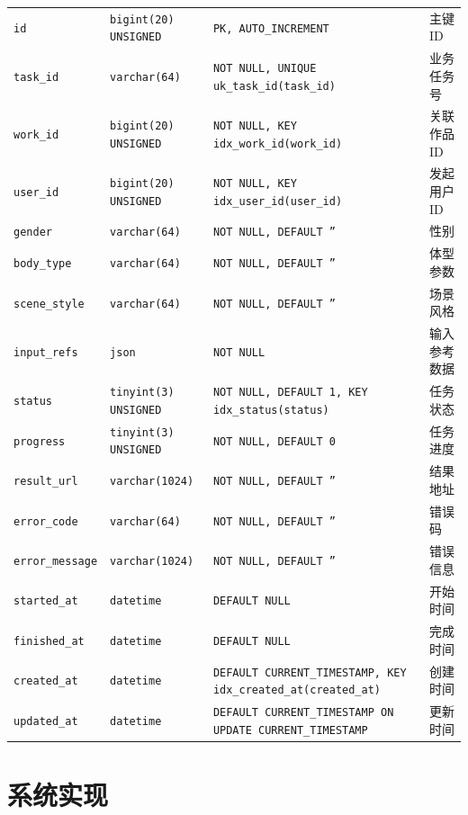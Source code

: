 \documentclass[twoside]{thesis-cls-Miya} %
\begin{document}
{\begin{longtable}{@{}>{\raggedright\arraybackslash}p{} >{\raggedright\arraybackslash}p{} >{\raggedright\arraybackslash}p{} >{\raggedright\arraybackslash}p{}@{}}
\texttt{id} & \texttt{bigint(20) UNSIGNED} & \texttt{PK, AUTO\_INCREMENT} & 主键 ID \\
\texttt{task\_\allowbreak id} & \texttt{varchar(64)} & \texttt{NOT NULL, UNIQUE uk\_task\_id(task\_id)} & 业务任务号 \\
\texttt{work\_\allowbreak id} & \texttt{bigint(20) UNSIGNED} & \texttt{NOT NULL, KEY idx\_work\_id(work\_id)} & 关联作品 ID \\
\texttt{user\_\allowbreak id} & \texttt{bigint(20) UNSIGNED} & \texttt{NOT NULL, KEY idx\_user\_id(user\_id)} & 发起用户 ID \\
\texttt{gender} & \texttt{varchar(64)} & \texttt{NOT NULL, DEFAULT ''} & 性别 \\
\texttt{body\_\allowbreak type} & \texttt{varchar(64)} & \texttt{NOT NULL, DEFAULT ''} & 体型参数 \\
\texttt{scene\_\allowbreak style} & \texttt{varchar(64)} & \texttt{NOT NULL, DEFAULT ''} & 场景风格 \\
\texttt{input\_\allowbreak refs} & \texttt{json} & \texttt{NOT NULL} & 输入参考数据 \\
\texttt{status} & \texttt{tinyint(3) UNSIGNED} & \texttt{NOT NULL, DEFAULT 1, KEY idx\_status(status)} & 任务状态 \\
\texttt{progress} & \texttt{tinyint(3) UNSIGNED} & \texttt{NOT NULL, DEFAULT 0} & 任务进度 \\
\texttt{result\_\allowbreak url} & \texttt{varchar(1024)} & \texttt{NOT NULL, DEFAULT ''} & 结果地址 \\
\texttt{error\_\allowbreak code} & \texttt{varchar(64)} & \texttt{NOT NULL, DEFAULT ''} & 错误码 \\
\texttt{error\_\allowbreak message} & \texttt{varchar(1024)} & \texttt{NOT NULL, DEFAULT ''} & 错误信息 \\
\texttt{started\_\allowbreak at} & \texttt{datetime} & \texttt{DEFAULT NULL} & 开始时间 \\
\texttt{finished\_\allowbreak at} & \texttt{datetime} & \texttt{DEFAULT NULL} & 完成时间 \\
\texttt{created\_\allowbreak at} & \texttt{datetime} & \texttt{DEFAULT CURRENT\_TIMESTAMP, KEY idx\_created\_at(created\_at)} & 创建时间 \\
\texttt{updated\_\allowbreak at} & \texttt{datetime} & \texttt{DEFAULT CURRENT\_TIMESTAMP ON UPDATE CURRENT\_TIMESTAMP} & 更新时间 \\
\end{longtable}
}

\chapter{系统实现}
\end{document}
